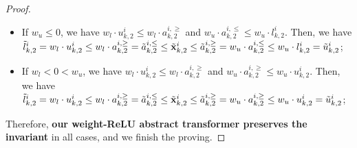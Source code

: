 \begin{proof}
\begin{itemize}
        \item If $w_u\le 0$, we have $ w_l \cdot u^i_{k,2} \le w_l \cdot a^{i,\ge}_{k,2}$ and $ w_u \cdot a^{i,\le}_{k,2} \le w_u \cdot l^i_{k,2}$. Then, we have $\tilde{l}^i_{k,2} = w_l \cdot u^i_{k,2} \le w_l \cdot a^{i,\ge}_{k,2} = \tilde{a}^{i,\le}_{k,2} \le \tilde{{\mathbf{x}}}^i_{k,2} \le \tilde{a}^{i,\ge}_{k,2} = w_u \cdot a^{i,\le}_{k,2} \le w_u\cdot l^i_{k,2} = \tilde{u}^i_{k,2}$;

        \item If $w_l<0<w_u$, we have $ w_l \cdot u^i_{k,2} \le w_l \cdot a^{i,\ge}_{k,2}$ and $ w_u \cdot a^{i,\ge}_{k,2} \le w_u \cdot u^i_{k,2}$. Then, we have $\tilde{l}^i_{k,2} = w_l \cdot u^i_{k,2} \le w_l \cdot a^{i,\ge}_{k,2} = \tilde{a}^{i,\le}_{k,2} \le \tilde{{\mathbf{x}}}^i_{k,2} \le \tilde{a}^{i,\ge}_{k,2} = w_u \cdot a^{i,\ge}_{k,2} \le w_u\cdot u^i_{k,2} = \tilde{u}^i_{k,2}$;
    \end{itemize}
    
    Therefore, \textbf{our weight-ReLU abstract transformer preserves the invariant} in all cases, and we finish the proving.
\end{proof}





